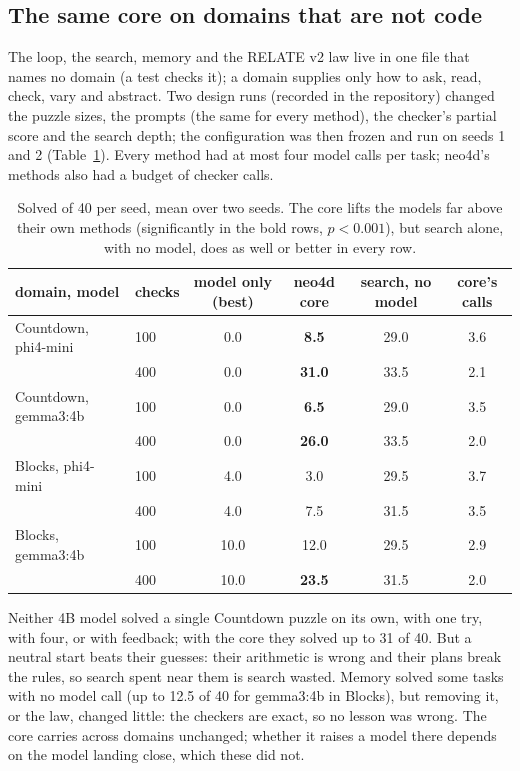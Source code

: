 \documentclass[10pt]{article}
\begin{document}
\subsection{The same core on domains that are not code}
\label{sec:core}
The loop, the search, memory and the RELATE v2 law live in one file that names no domain (a test checks it); a domain
supplies only how to ask, read, check, vary and abstract. Two design runs (recorded in the repository) changed the
puzzle sizes, the prompts (the same for every method), the checker's partial score and the search depth; the
configuration was then frozen and run on seeds 1 and 2 (Table~\ref{tab:core}). Every method had at most four model
calls per task; neo4d's methods also had a budget of checker calls.
\begin{table}[H]
\centering\small
\setlength{\tabcolsep}{4pt}
\begin{tabular}{llcccc}
\toprule
domain, model & checks & model only (best) & \textbf{neo4d core} & search, no model & core's calls\\
\midrule
Countdown, phi4-mini & 100 & 0.0 & \textbf{8.5} & 29.0 & 3.6\\
 & 400 & 0.0 & \textbf{31.0} & 33.5 & 2.1\\
Countdown, gemma3:4b & 100 & 0.0 & \textbf{6.5} & 29.0 & 3.5\\
 & 400 & 0.0 & \textbf{26.0} & 33.5 & 2.0\\
Blocks, phi4-mini & 100 & 4.0 & 3.0 & 29.5 & 3.7\\
 & 400 & 4.0 & 7.5 & 31.5 & 3.5\\
Blocks, gemma3:4b & 100 & 10.0 & 12.0 & 29.5 & 2.9\\
 & 400 & 10.0 & \textbf{23.5} & 31.5 & 2.0\\
\bottomrule
\end{tabular}
\caption{Solved of 40 per seed, mean over two seeds. The core lifts the models far above their own methods
(significantly in the bold rows, $p<0.001$), but search alone, with no model, does as well or better in every row.}
\label{tab:core}
\end{table}
Neither 4B model solved a single Countdown puzzle on its own, with one try, with four, or with feedback; with the core
they solved up to 31 of 40. But a neutral start beats their guesses: their arithmetic is wrong and their plans break
the rules, so search spent near them is search wasted. Memory solved some tasks with no model call (up to 12.5 of 40
for gemma3:4b in Blocks), but removing it, or the law, changed little: the checkers are exact, so no lesson was wrong.
The core carries across domains unchanged; whether it raises a model there depends on the model landing close, which
these did not.
\end{document}
